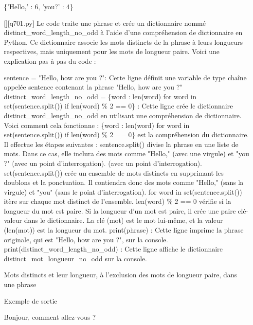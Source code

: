 \{'Hello,' : 6, 'you?' : 4\}
        \par
        \begin{solution}
            \renewcommand{\nomfichier}{q701.py}
            \pythonfile{\chemincode \nomfichier}[][\nomfichier]
            Le code traite une phrase et crée un dictionnaire nommé distinct\_word\_length\_no\_odd à l'aide d'une compréhension de dictionnaire en Python. Ce dictionnaire associe les mots distincts de la phrase à leurs longueurs respectives, mais uniquement pour les mots de longueur paire. Voici une explication pas à pas du code :

    sentence = "Hello, how are you ?": Cette ligne définit une variable de type chaîne appelée sentence contenant la phrase "Hello, how are you ?"
    distinct\_word\_length\_no\_odd = \{word : len(word) for word in set(sentence.split()) if len(word) \% 2 == 0\} : Cette ligne crée le dictionnaire distinct\_word\_length\_no\_odd en utilisant une compréhension de dictionnaire. Voici comment cela fonctionne :
        \{word : len(word) for word in set(sentence.split()) if len(word) \% 2 == 0\} est la compréhension du dictionnaire. Il effectue les étapes suivantes :
        sentence.split() divise la phrase en une liste de mots. Dans ce cas, elle inclura des mots comme "Hello," (avec une virgule) et "you ?" (avec un point d'interrogation). (avec un point d'interrogation).
        set(sentence.split()) crée un ensemble de mots distincts en supprimant les doublons et la ponctuation. Il contiendra donc des mots comme "Hello," (sans la virgule) et "you" (sans le point d'interrogation).
        for word in set(sentence.split()) itère sur chaque mot distinct de l'ensemble.
        len(word) \% 2 == 0 vérifie si la longueur du mot est paire.
        Si la longueur d'un mot est paire, il crée une paire clé-valeur dans le dictionnaire. La clé (mot) est le mot lui-même, et la valeur (len(mot)) est la longueur du mot.
    print(phrase) : Cette ligne imprime la phrase originale, qui est "Hello, how are you ?", sur la console.
    print(distinct\_word\_length\_no\_odd) : Cette ligne affiche le dictionnaire distinct\_mot\_longueur\_no\_odd sur la console.
        \end{solution}
        

        \question
        Mots distincts et leur longueur, à l'exclusion des mots de longueur paire, dans une phrase

Exemple de sortie

Bonjour, comment allez-vous ?

